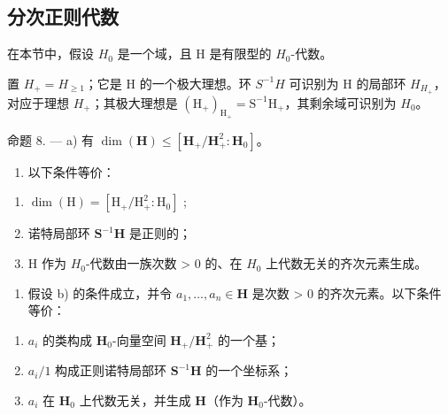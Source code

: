 \subsection{分次正则代数}

在本节中，假设 \(H_{0}\) 是一个域，且 H 是有限型的 \(H_{0}\)-代数。

置 \(H_{+} = H_{\geqslant 1}\)；它是 H 的一个极大理想。环 \(S^{-1}H\) 可识别为 H 的局部环 \(H_{H_{+}}\)，对应于理想 \(H_{+}\)；其极大理想是 \((\mathrm{H}_{+})_{\mathrm{H}_{+}} = \mathrm{S}^{-1}\mathrm{H}_{+}\)，其剩余域可识别为 \(H_{0}\)。

命题 8. --- a) 有 \(\dim(\mathbf{H}) \leqslant [\mathbf{H}_{+}/\mathbf{H}_{+}^{2}:\mathbf{H}_{0}]\)。

\begin{enumerate}
\def\labelenumi{\alph{enumi})}
\setcounter{enumi}{1}
\tightlist
\item
  以下条件等价：
\end{enumerate}

\begin{enumerate}
\def\labelenumi{(\roman{enumi})}
\item
  \(\dim (\mathrm{H}) = [\mathrm{H}_{+} / \mathrm{H}_{+}^{2}:\mathrm{H}_{0}]\) ;
\item
  诺特局部环 \(\mathbf{S}^{-1}\mathbf{H}\) 是正则的；
\item
  H 作为 \(H_{0}\)-代数由一族次数 \textgreater{} 0 的、在 \(H_{0}\) 上代数无关的齐次元素生成。
\end{enumerate}

\begin{enumerate}
\def\labelenumi{\alph{enumi})}
\setcounter{enumi}{2}
\tightlist
\item
  假设 b) 的条件成立，并令 \(a_{1}, \ldots, a_{n} \in \mathbf{H}\) 是次数 \textgreater{} 0 的齐次元素。以下条件等价：
\end{enumerate}

\begin{enumerate}
\def\labelenumi{(\roman{enumi})}
\item
  \(a_{i}\) 的类构成 \(\mathbf{H}_{0}\)-向量空间 \(\mathbf{H}_{+}/\mathbf{H}_{+}^{2}\) 的一个基；
\item
  \(a_{i}/1\) 构成正则诺特局部环 \(\mathbf{S}^{-1}\mathbf{H}\) 的一个坐标系；
\item
  \(a_{i}\) 在 \(\mathbf{H}_{0}\) 上代数无关，并生成 \(\mathbf{H}\)（作为 \(\mathbf{H}_{0}\)-代数）。
\end{enumerate}

